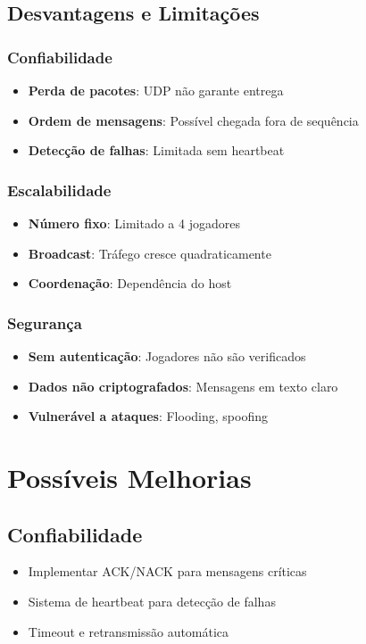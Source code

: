 \documentclass[12pt,a4paper]{article}
\begin{document}
\subsection{Desvantagens e Limitações}

\subsubsection{Confiabilidade}
\begin{itemize}
    \item \textbf{Perda de pacotes}: UDP não garante entrega
    \item \textbf{Ordem de mensagens}: Possível chegada fora de sequência
    \item \textbf{Detecção de falhas}: Limitada sem heartbeat
\end{itemize}

\subsubsection{Escalabilidade}
\begin{itemize}
    \item \textbf{Número fixo}: Limitado a 4 jogadores
    \item \textbf{Broadcast}: Tráfego cresce quadraticamente
    \item \textbf{Coordenação}: Dependência do host
\end{itemize}

\subsubsection{Segurança}
\begin{itemize}
    \item \textbf{Sem autenticação}: Jogadores não são verificados
    \item \textbf{Dados não criptografados}: Mensagens em texto claro
    \item \textbf{Vulnerável a ataques}: Flooding, spoofing
\end{itemize}

\section{Possíveis Melhorias}

\subsection{Confiabilidade}
\begin{itemize}
    \item Implementar ACK/NACK para mensagens críticas
    \item Sistema de heartbeat para detecção de falhas
    \item Timeout e retransmissão automática
\end{itemize}
\end{document}
